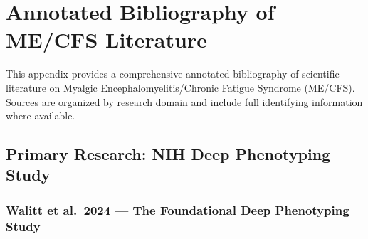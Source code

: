 \chapter{Annotated Bibliography of ME/CFS Literature}
\label{app:annotated-bibliography}

This appendix provides a comprehensive annotated bibliography of scientific literature on Myalgic Encephalomyelitis/Chronic Fatigue Syndrome (ME/CFS). Sources are organized by research domain and include full identifying information where available.

\section{Primary Research: NIH Deep Phenotyping Study}
\label{sec:bib-nih-deep-phenotyping}

\subsection{Walitt et al.\ 2024 --- The Foundational Deep Phenotyping Study}

